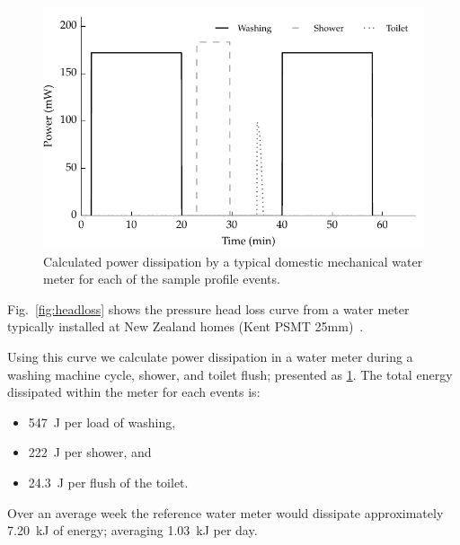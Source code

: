     \begin{figure}
        \centering
        \includegraphics[width=\linewidth]{content/pt1/02-WirelessWaterMeter/graphics/graph_harvest}
        \caption{Calculated power dissipation by a typical domestic mechanical water meter for each of the sample profile events.}
        \label{fig:powerDissipated_meter}
    \end{figure}

    Fig.~\ref{fig:headloss} shows the pressure head loss curve from a water meter typically installed at New Zealand homes (Kent PSMT 25mm)~\cite{WatercareNewZealand2014}.

    Using this curve we calculate power dissipation in a water meter during a washing machine cycle, shower, and toilet flush; presented as \cref{fig:powerDissipated_meter}.
    The total energy dissipated within the meter for each events is:
    \begin{itemize}
    \item \SI{547}{\joule} per load of washing,
    \item \SI{222}{\joule} per shower, and
    \item \SI{24.3}{\joule} per flush of the toilet.
    \end{itemize}


    Over an average week the reference water meter would dissipate approximately \SI{7.20}{\kilo\joule} of energy; averaging \SI{1.03}{\kilo\joule} per day.


